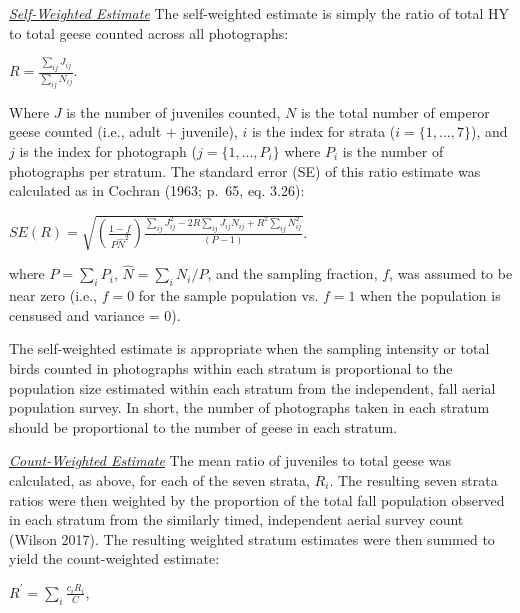 \documentclass[]{article}
\begin{document}
\setlength{\parskip}{1ex} \setlength{\parindent}{4em}
\underline{\textit{Self-Weighted Estimate}} \setlength{\parindent}{0in}
The self-weighted estimate is simply the ratio of total HY to total
geese counted across all photographs:\\

\begin{center}
$R = \frac{ \sum_{ij} J_{ij} }{ \sum_{ij} N_{ij} }$.
\end{center}

\medskip
Where \(J\) is the number of juveniles counted, \(N\) is the total
 number of emperor geese counted (i.e., adult + juvenile), \(i\) is the
index for strata (\(i = \{1, ..., 7\}\)), and \(j\) is the index for
photograph (\(j = \{1, ..., P_i\}\) where \(P_i\) is the number of
photographs per stratum. The standard error (SE) of this ratio
estimate was calculated as in Cochran (1963; p.~65, eq. 3.26): \medskip

\begin{center}
$SE(R) = \sqrt { (\frac{1 - f}{P\hat{N}^2}) \frac{\sum_{ij} J_{ij}^2 - 2R \sum_{ij} J_{ij} N_{ij} + R^2 \sum_{ij}N_{ij}^2}{(P - 1)} }$.
\end{center}

\medskip
where \(P = \sum_i P_i\), \(\hat{N}=\sum_i{N_i}/P\), and the sampling
fraction, \(f\), was assumed to be near zero (i.e., \(f = 0\) for the
sample population vs. \(f = 1\) when the population is censused and
variance = 0).

The self-weighted estimate is appropriate when the sampling intensity or
total birds counted in photographs within each stratum is proportional
to the population size estimated within each stratum from the
independent, fall aerial population survey. In short, the number of
photographs taken in each stratum should be proportional to the number
of geese in each stratum.

\setlength{\parskip}{1ex} \setlength{\parindent}{4em}
\underline{\textit{Count-Weighted Estimate}} \setlength{\parindent}{0in}
The mean ratio of juveniles to total geese was calculated, as above, for
each of the seven strata, \(R_i\). The resulting seven strata ratios
were then weighted by the proportion of the total fall population
observed in each stratum from the similarly timed, independent aerial
survey count (Wilson 2017). The resulting weighted stratum estimates
were then summed to yield the count-weighted estimate: \medskip

\begin{center}
$R^\prime = \sum_i \frac{c_iR_i}{C}$, 
\end{center}
\end{document}
